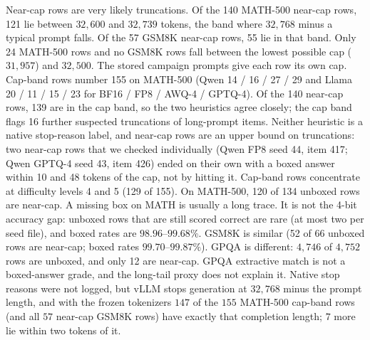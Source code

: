 \documentclass[11pt,a4paper]{article}
\begin{document}
Near-cap rows are very likely truncations. Of the 140 MATH-500 near-cap rows, 121 lie between $32{,}600$ and $32{,}739$ tokens, the band where $32{,}768$ minus a typical prompt falls. Of the 57 GSM8K near-cap rows, 55 lie in that band. Only 24 MATH-500 rows and no GSM8K rows fall between the lowest possible cap ($31{,}957$) and $32{,}500$. The stored campaign prompts give each row its own cap. Cap-band rows number 155 on MATH-500 (Qwen 14 / 16 / 27 / 29 and Llama 20 / 11 / 15 / 23 for BF16 / FP8 / AWQ-4 / GPTQ-4). Of the 140 near-cap rows, 139 are in the cap band, so the two heuristics agree closely; the cap band flags 16 further suspected truncations of long-prompt items. Neither heuristic is a native stop-reason label, and near-cap rows are an upper bound on truncations: two near-cap rows that we checked individually (Qwen FP8 seed 44, item 417; Qwen GPTQ-4 seed 43, item 426) ended on their own with a boxed answer within 10 and 48 tokens of the cap, not by hitting it. Cap-band rows concentrate at difficulty levels 4 and 5 (129 of 155). On MATH-500, 120 of 134 unboxed rows are near-cap. A missing box on MATH is usually a long trace. It is not the 4-bit accuracy gap: unboxed rows that are still scored correct are rare (at most two per seed file), and boxed rates are $98.96$--$99.68\%$. GSM8K is similar (52 of 66 unboxed rows are near-cap; boxed rates $99.70$--$99.87\%$). GPQA is different: $4{,}746$ of $4{,}752$ rows are unboxed, and only 12 are near-cap. GPQA extractive match is not a boxed-answer grade, and the long-tail proxy does not explain it. Native stop reasons were not logged, but vLLM stops generation at $32{,}768$ minus the prompt length, and with the frozen tokenizers $147$ of the $155$ MATH-500 cap-band rows (and all $57$ near-cap GSM8K rows) have exactly that completion length; $7$ more lie within two tokens of it.
\end{document}
